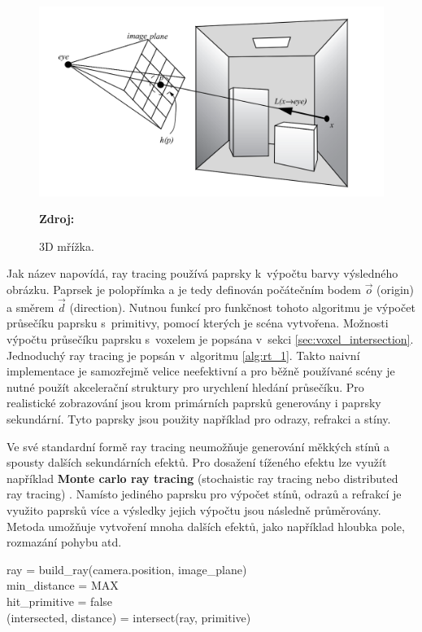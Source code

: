 \begin{figure}[H]
	\centering
	\includegraphics[scale=1]{obrazky-figures/ray_tracing_plane.png}
	\caption{3D mřížka.}
	\textbf{Zdroj: \cite{advanced_global}}
	\label{fig:3d_grid}
\end{figure}


Jak název napovídá, ray tracing používá paprsky k~výpočtu barvy výsledného obrázku. Paprsek je polopřímka a je tedy definován počátečním bodem $\Vec{o}$ (origin) a směrem $\Vec{d}$ (direction). Nutnou funkcí pro funkčnost tohoto algoritmu je výpočet průsečíku paprsku s~primitivy, pomocí kterých je scéna vytvořena. Možnosti výpočtu průsečíku paprsku s~voxelem je popsána v~sekci \ref{sec:voxel_intersection}. Jednoduchý ray tracing je popsán v~algoritmu \ref{alg:rt_1}. Takto naivní implementace je samozřejmě velice neefektivní a pro běžně používané scény je nutné použít akcelerační struktury pro urychlení hledání průsečíku\cite{accelerated_rt}. Pro realistické zobrazování jsou krom primárních paprsků generovány i paprsky sekundární. Tyto paprsky jsou použity například pro odrazy, refrakci a stíny.

Ve své standardní formě ray tracing neumožňuje generování měkkých stínů a spousty dalších sekundárních efektů.  Pro dosažení tíženého efektu lze využít například \textbf{Monte carlo ray tracing} (stochaistic ray tracing nebo distributed ray tracing) \cite{distributed_rt}. Namísto jediného paprsku pro výpočet stínů, odrazů a refrakcí je využito paprsků více a výsledky jejich výpočtu jsou následně průměrovány. Metoda umožňuje vytvoření mnoha dalších efektů, jako například hloubka pole, rozmazání pohybu atd.

\begin{center}
	\begin{czechalgorithm}[H] \label{alg:rt_1}
		ray = build\_ray(camera.position, image\_plane)\\
		min\_distance = MAX\\
		hit\_primitive = false\\
		 {
			(intersected, distance) = intersect(ray, primitive)\\
		}
		\caption{Ray tracing}
	\end{czechalgorithm}
\end{center}

